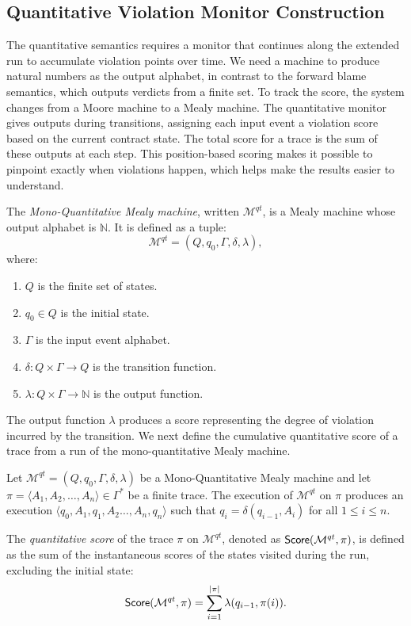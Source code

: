 \subsection{Quantitative Violation Monitor Construction}
The quantitative semantics requires a monitor that continues along the extended run to accumulate violation points over time. We need a machine to produce natural numbers as the output alphabet, in contrast to the forward blame semantics, which outputs verdicts from a finite set.
To track the score, the system changes from a Moore machine to a Mealy machine. The quantitative monitor gives outputs during transitions, assigning each input event a violation score based on the current contract state. The total score for a trace is the sum of these outputs at each step.
This position-based scoring makes it possible to pinpoint exactly when violations happen, which helps make the results easier to understand.

\begin{definition}
  \label{def:quant-monitor}
  The \emph{Mono-Quantitative Mealy machine}, written $\mathcal{M}^{qt}$, is a Mealy machine whose output alphabet is $\mathbb{N}$. It is defined as a tuple:
  \[
  \mathcal{M}^{qt} = (Q, q_0, \Gamma, \delta, \lambda),
  \]
  where:
  \begin{enumerate}
    \item $Q$ is the finite set of states.
    \item $q_0 \in Q$ is the initial state.
    \item $\Gamma$ is the input event alphabet.
    \item $\delta: Q \times \Gamma \to Q$ is the transition function.
    \item $\lambda: Q \times \Gamma \to \mathbb{N}$ is the output function.
  \end{enumerate}
  \end{definition}

  The output function $\lambda$ produces a score representing the degree of violation incurred by the transition.
 We next define the cumulative quantitative score of a trace from a run of the mono-quantitative Mealy machine.
  \newpage
\begin{definition}
    \label{def:quant-execution-score}
    Let $\mathcal{M}^{qt} = (Q, q_0, \Gamma, \delta, \lambda)$ be a Mono-Quantitative Mealy machine and let $\pi = \langle A_1, A_2, \dots, A_{n} \rangle \in \Gamma^*$ be a finite trace.
    The execution of $\mathcal{M}^{qt}$ on $\pi$ produces an execution $\langle q_0, A_1, q_1, A_2 \dots, A_{n}, q_n \rangle$ such that $q_{i} = \delta(q_{i-1}, A_i)$ for all $1 \le i \le n$.
    
    The \emph{quantitative score} of the trace $\pi$ on $\mathcal{M}^{qt}$, denoted as $\mathsf{Score}( \mathcal{M}^{qt},\pi)$, is defined as the sum of the instantaneous scores of the states visited during the run, excluding the initial state:
    \[
        \mathsf{Score}( \mathcal{M}^{qt},\pi) = \sum_{i=1}^{\vert \pi\vert} \lambda(q_{i-1},\pi(i)).
    \]
    \end{definition}

